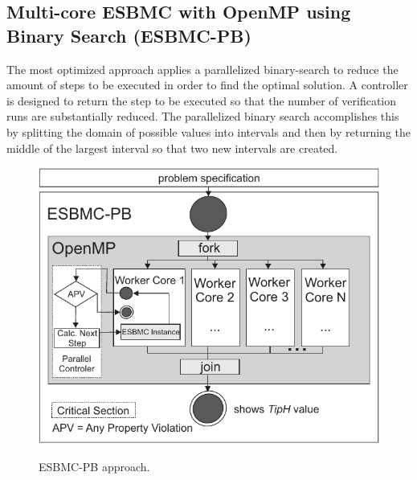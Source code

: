 \documentclass{doublecol-new}
\theoremstyle{TH}{
\newtheorem{lemma}{Lemma}
\newtheorem{theorem}[lemma]{Theorem}
\newtheorem{corrolary}[lemma]{Corrolary}
\newtheorem{conjecture}[lemma]{Conjecture}
\newtheorem{proposition}[lemma]{Proposition}
\newtheorem{claim}[lemma]{Claim}
\newtheorem{stheorem}[lemma]{Wrong Theorem}
\newtheorem{algorithm}{Algorithm}
}
\theoremstyle{THrm}{
\newtheorem{definition}{Definition}[section]
\newtheorem{question}{Question}[section]
\newtheorem{remark}{Remark}
\newtheorem{scheme}{Scheme}
}
\theoremstyle{THhit}{
\newtheorem{case}{Case}[section]
}
\begin{document}


\subsection{Multi-core ESBMC with OpenMP using Binary Search (ESBMC-PB)}
\label{Multi-core-ESBMC-with-OpenMP-using-Binary-Search}

The most optimized approach applies a parallelized binary-search to reduce the amount of steps to be executed in order to find the optimal solution. A controller is designed to return the step to be executed so that the number of verification runs are substantially reduced. The parallelized binary search accomplishes this by splitting the domain of possible values into intervals and then by returning the middle of the largest interval so that two new intervals are created.

\begin{figure}[ht]
	\caption{ESBMC-PB approach.}
	\centering
	\includegraphics[scale=0.77]{figures/esbmc-pb.pdf} 
	\label{ESBMC-Binary-Approach}
\end{figure}
\end{document}
